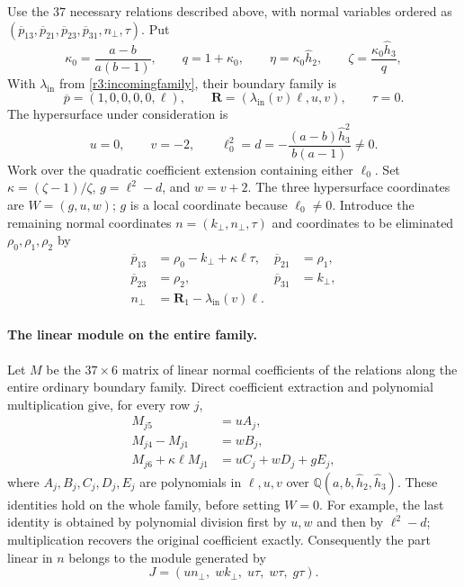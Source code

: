 \documentclass[11pt,a4paper]{article}
\numberwithin{equation}{section}
\theoremstyle{plain}
\theoremstyle{definition}
\theoremstyle{remark}
\begin{document}
Use the $37$ necessary relations described above, with normal
variables ordered as $(\overline p_{13},\overline p_{21},\overline p_{23},\overline p_{31},n_\perp,\tau)$.  Put
\[
 \kappa_0 =\frac{a-b}{a(b-1)},\qquad q=1+\kappa_0 ,\qquad
 \eta =\kappa_0 \widehat h_2 ,\qquad \zeta =\frac{\kappa_0 \widehat h_3 }{q},
\]
With $\lambda_{\mathrm{in}}$ from \eqref{r3:incomingfamily}, their boundary family is
\[
 \overline p=(1,0,0,0,0,\ell),\qquad
 \boldsymbol R=(\lambda_{\mathrm{in}}(v)\ell,u,v),\qquad \tau=0.
\]
The hypersurface under consideration is
\begin{equation}\label{appr3tau:wallpoint}
 u=0,\qquad v=-2,\qquad
 \ell_0^2=d=-\frac{(a-b)\widehat h_3 ^2}{b(a-1)}\ne0.
\end{equation}
Work over the quadratic coefficient extension containing either
$\ell_0$.  Set $\kappa=(\zeta -1)/\zeta $, $g=\ell^2-d$, and $w=v+2$.
The three hypersurface coordinates are $W=(g,u,w)$; $g$ is a local coordinate
because $\ell_0\ne0$.  Introduce the remaining normal coordinates
$n=(k_\perp,n_\perp,\tau)$ and coordinates to be eliminated $\rho_0,\rho_1,\rho_2$ by
\begin{equation}\label{appr3tau:coordinates}
 \begin{aligned}
 \overline p_{13}&=\rho_0-k_\perp+\kappa\ell\tau,& \overline p_{21}&=\rho_1,\\
 \overline p_{23}&=\rho_2,& \overline p_{31}&=k_\perp,\\
 n_\perp&=\boldsymbol R_1-\lambda_{\mathrm{in}}(v)\ell.
 \end{aligned}
\end{equation}

\paragraph{The linear module on the entire family.}
Let $M$ be the $37\times6$ matrix of linear normal coefficients of the
relations along the entire ordinary boundary family.  Direct coefficient extraction
and polynomial multiplication give, for every row $j$,
\begin{equation}\label{appr3tau:linearmodule}
 \begin{aligned}
 M_{j5}&=uA_j,\\
 M_{j4}-M_{j1}&=wB_j,\\
 M_{j6}+\kappa\ell M_{j1}&=uC_j+wD_j+gE_j,
 \end{aligned}
\end{equation}
where $A_j,B_j,C_j,D_j,E_j$ are polynomials in $\ell,u,v$ over
$\mathbb Q(a,b,\widehat h_2 ,\widehat h_3 )$.  These identities hold on the whole family, before
setting $W=0$.  For example, the last identity is obtained by polynomial
division first by $u,w$ and then by $\ell^2-d$; multiplication recovers
the original coefficient exactly.  Consequently the part linear in $n$ belongs to the module
generated by
\begin{equation}\label{appr3tau:J}
 J=(un_\perp,\;w k_\perp,\;u\tau,\;w\tau,\;g\tau).
\end{equation}
\end{document}
